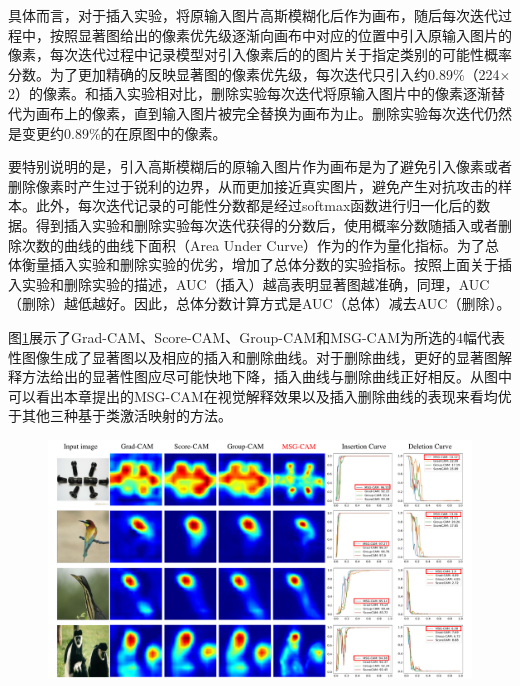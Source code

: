 具体而言，对于插入实验，将原输入图片高斯模糊化后作为画布，随后每次迭代过程中，按照显著图给出的像素优先级逐渐向画布中对应的位置中引入原输入图片的像素，每次迭代过程中记录模型对引入像素后的的图片关于指定类别的可能性概率分数。为了更加精确的反映显著图的像素优先级，每次迭代只引入约0.89\%（224$\times$2）的像素。和插入实验相对比，删除实验每次迭代将原输入图片中的像素逐渐替代为画布上的像素，直到输入图片被完全替换为画布为止。删除实验每次迭代仍然是变更约0.89\%的在原图中的像素。

要特别说明的是，引入高斯模糊后的原输入图片作为画布是为了避免引入像素或者删除像素时产生过于锐利的边界，从而更加接近真实图片，避免产生对抗攻击的样本。此外，每次迭代记录的可能性分数都是经过softmax函数进行归一化后的数据。得到插入实验和删除实验每次迭代获得的分数后，使用概率分数随插入或者删除次数的曲线的曲线下面积（Area Under Curve）作为的作为量化指标。为了总体衡量插入实验和删除实验的优劣，增加了总体分数的实验指标。按照上面关于插入实验和删除实验的描述，AUC（插入）越高表明显著图越准确，同理，AUC（删除）越低越好。因此，总体分数计算方式是AUC（总体）减去AUC（删除）。

图\ref{fig:IDCurve}展示了Grad-CAM、Score-CAM、Group-CAM和MSG-CAM为所选的4幅代表性图像生成了显著图以及相应的插入和删除曲线。对于删除曲线，更好的显著图解释方法给出的显著性图应尽可能快地下降，插入曲线与删除曲线正好相反。从图中可以看出本章提出的MSG-CAM在视觉解释效果以及插入删除曲线的表现来看均优于其他三种基于类激活映射的方法。
\begin{figure}[!ht]
	\centering 
	\includegraphics[width=15cm]{fig/ch3/IDCurve.pdf}
	\label{fig:IDCurve}
\end{figure}

